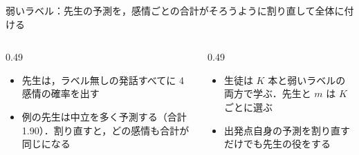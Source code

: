 \begin{frame}{弱いラベル：先生の予測を，感情ごとの合計がそろうように割り直して全体に付ける}
\begin{columns}[T,onlytextwidth]
\begin{column}{0.49\textwidth}
\begin{itemize}
        \item 先生は，ラベル無しの発話すべてに 4 感情の確率を出す
        \item 例の先生は中立を多く予測する（合計 1.90）．割り直すと，どの感情も合計が同じになる
      \end{itemize}
    \end{column}
    \begin{column}{0.49\textwidth}
      \begin{itemize}\scriptsize\setlength{\itemsep}{3pt}
        \item 生徒は $K$ 本と弱いラベルの両方で学ぶ．先生と $m$ は $K$ ごとに選ぶ
        \item 出発点自身の予測を割り直すだけでも先生の役をする
      \end{itemize}
    \end{column}
  \end{columns}
\end{frame}

